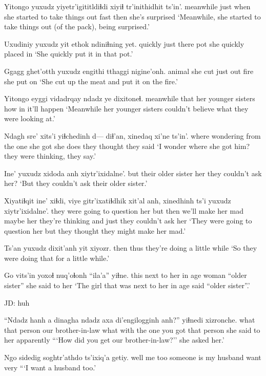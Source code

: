 \documentclass[12pt]{article}
\begin{document}
\gll Yitongo yuxudz yiyetr'igititldiɬdi xiyiɬ tr'inithidhit ts'in'.
meanwhile just {when she started to take things out fast} then {she's surprised} 
\glt `Meanwhile, she started to take things out (of the pack), being surprised.'
\glend

\gll Uxudiniy yuxudz yit ethok ndiniɬning yet.
quickly  just   there pot {she quickly placed} in
\glt `She quickly put it in that pot.'
\glend

\gll Ggagg ghet'otth yuxudz engithi tthaggi nigine'onh.
animal {she cut} just out fire {she put on}
\glt `She cut up the meat and put it on the fire.'
\glend

\gll Yitongo eyggi vidadrqay ndadz ye dixitoneɬ.
meanwhile that {her younger sisters} how in {it'll happen}
\glt `Meanwhile her younger sisters couldn't believe what they were looking at.'
\glend

\gll Ndagh sre' xits'i yiɬchedinh d--- diɬ'an, xinedaq xi'ne ts'in'.
where wondering from {the one she got} {} {she does} {they thought} {they said}
\glt `I wonder where she got him? they were thinking, they say.'
\glend

\gll Ine' yuxudz xidoda anh xiytr'ixidalne'.
but  {}       {their older sister} her {they couldn't ask her?}
\glt `But they couldn't ask their older sister.'
\glend

\gll Xiyatiɬqit ine' xiɬdi, {viye gitr'ixatiɬdhik} xit'al anh, xinedhinh ts'i yuxudz xiytr'ixidalne'.
{they were going to question her} but then {we'll make her mad} maybe her {they're thinking} and just {they couldn't ask her}
\glt `They were going to question her but they thought they might make her mad.'
\glend

\gll Ts'an yuxudz dixit'anh {yit xiyozr.}
then  thus   {they're doing} {a little while}
\glt `So they were doing that for a little while.'
\glend

\gll Go {vits'in yoxoɬ} nuq'oɬonh ``ila'a'' yiɬne. 
this {next to her in age} woman {``older sister''} {she said to her}
\glt `The girl that was next to her in age said ``older sister''.'
\glend

JD:  huh

\gll ``Ndadz hanh a dinagha ndadz axa di'engilogginh anh?'' yiɬnedi xizronche.
what  {that person} {} {our brother-in-law} what with {the one you got} {that person} {she said to her} apparently
\glt ```How did you get our brother-in-law?'' she asked her.'
\glend

\gll Ngo sidedig soghtr'athdo ts'ixiq'a getiy.
well {me too} {someone is my husband} want very
\glt ```I want a husband too.'
\glend
\end{document}
